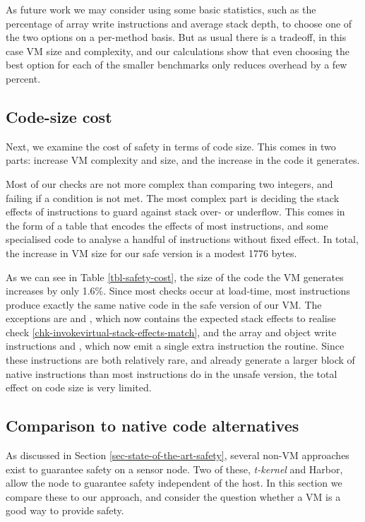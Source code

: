 As future work we may consider using some basic statistics, such as the percentage of array write instructions and average stack depth, to choose one of the two options on a per-method basis. But as usual there is a tradeoff, in this case VM size and complexity, and our calculations show that even choosing the best option for each of the smaller benchmarks only reduces overhead by a few percent.

\subsection{Code-size cost}
Next, we examine the cost of safety in terms of code size. This comes in two parts: increase VM complexity and size, and the increase in the code it generates.

Most of our checks are not more complex than comparing two integers, and failing if a condition is not met. The most complex part is deciding the stack effects of instructions to guard against stack over- or underflow. This comes in the form of a table that encodes the effects of most instructions, and some specialised code to analyse a handful of instructions without fixed effect. In total, the increase in VM size for our safe version is a modest 1776 bytes.

As we can see in Table \ref{tbl-safety-cost}, the size of the code the VM generates increases by only 1.6\%. Since most checks occur at load-time, most instructions produce exactly the same native code in the safe version of our VM. The exceptions are  and , which now contains the expected stack effects to realise check \ref{chk-invokevirtual-stack-effects-match}, and the array and object write instructions  and , which now emit a single extra  instruction the  routine. Since these instructions are both relatively rare, and already generate a larger block of native instructions than most instructions do in the unsafe version, the total effect on code size is very limited.

\subsection{Comparison to native code alternatives}
As discussed in Section \ref{sec-state-of-the-art-safety}, several non-VM approaches exist to guarantee safety on a sensor node. Two of these, \emph{t-kernel} and Harbor, allow the node to guarantee safety independent of the host. In this section we compare these to our approach, and consider the question whether a VM is a good way to provide safety.

